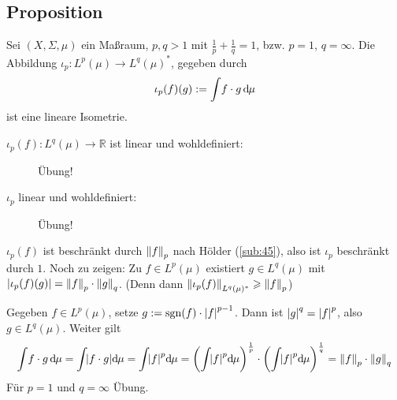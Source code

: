 \subsection[Proposition: Lineare Isometrie $\iota_p : L^p(\mu) \to L^q(\mu)^*$]{Proposition} %
\label{sub:410}
Sei $(X,\Sigma,\mu)$ ein Maßraum, $p,q >1$ mit $\frac{1}{p} + \frac{1}{q}=1$, bzw. $p=1$, $q=\infty$. Die Abbildung $\iota_p : L^p(\mu) \to L^q(\mu)^*$, gegeben durch
\[
	\iota_p(f)(g) := \int \! f \cdot g \, \mathd \mu
\]
ist eine lineare Isometrie.
\begin{description}
	\item[$\iota_p(f) : L^q(\mu) \to \mathds{R}$ ist linear und wohldefiniert:] Übung!
	\item[$\iota_p$ linear und wohldefiniert:] Übung!
\end{description}
$\iota_p(f)$ ist beschränkt durch $\norm[p]{f}$ nach Hölder (\ref{sub:45}), also ist $\iota_p$ beschränkt durch $1$. Noch zu zeigen: Zu $f \in L^p(\mu)$ existiert 
$g \in L^q(\mu)$ mit $\abs*{\iota_p(f)(g)} = \norm[p]{f} \cdot \norm[q]{g}$. (Denn dann $\norm[L^q(\mu)^*]{\iota_p(f)}  \ge \norm[p]{f}$)

\noindent Gegeben $f \in L^p(\mu)$, setze $g := \sgn(f) \cdot \abs*{f}^{p-1}$. Dann ist $\abs*{g}^q= \abs*{f}^p$, also $g \in L^q(\mu)$. Weiter gilt
\begin{align*}
	\int \!f \cdot g \,\mathd \mu = \int \! \abs*{f \cdot g} \mathd \mu = \int \!\abs*{f}^p \mathd \mu  = \enbrace*{\int\! \abs*{f}^p \mathd \mu }^{\frac{1}{p}}
	\cdot  \enbrace*{\int \!  \abs*{f}^p \mathd\mu}^{\frac{1}{q}} = \norm[p]{f} \cdot \norm[q]{g}    
\end{align*}
Für $p=1$ und $q=\infty$ Übung. \bewende

